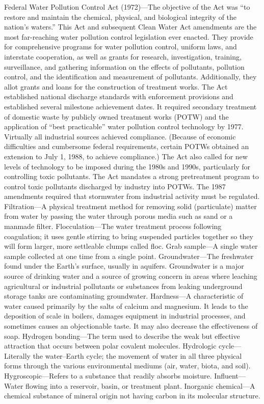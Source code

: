 \documentclass{article}
\begin{document}
Federal Water Pollution Control Act (1972)---The objective of the Act
was ``to restore and maintain the chemical, physical, and biological
integrity of the nation's waters.'' This Act and subsequent Clean Water
Act amendments are the most far-reaching water pollution control
legislation ever enacted. They provide for comprehensive programs for
water pollution control, uniform laws, and interstate cooperation, as
well as grants for research, investigation, training, surveillance, and
gathering information on the effects of pollutants, pollution control,
and the identification and measurement of pollutants. Additionally, they
allot grants and loans for the construction of treatment works. The Act
established national discharge standards with enforcement provisions and
established several milestone achievement dates. It required secondary
treatment of domestic waste by publicly owned treatment works (POTW) and
the application of ``best practicable'' water pollution control
technology by 1977. Virtually all industrial sources achieved
compliance. (Because of economic difficulties and cumbersome federal
requirements, certain POTWs obtained an extension to July 1, 1988, to
achieve compliance.) The Act also called for new levels of technology to
be imposed during the 1980s and 1990s, particularly for controlling
toxic pollutants. The Act mandates a strong pretreatment program to
control toxic pollutants discharged by industry into POTWs. The 1987
amendments required that stormwater from industrial activity must be
regulated. Filtration---A physical treatment method for removing solid
(particulate) matter from water by passing the water through porous
media such as sand or a manmade filter. Flocculation---The water
treatment process following coagulation; it uses gentle stirring to
bring suspended particles together so they will form larger, more
settleable clumps called floc. Grab sample---A single water sample
collected at one time from a single point. Groundwater---The freshwater
found under the Earth's surface, usually in aquifers. Groundwater is a
major source of drinking water and a source of growing concern in areas
where leaching agricultural or industrial pollutants or substances from
leaking underground storage tanks are contaminating groundwater.
Hardness---A characteristic of water caused primarily by the salts of
calcium and magnesium. It leads to the deposition of scale in boilers,
damages equipment in industrial processes, and sometimes causes an
objectionable taste. It may also decrease the effectiveness of soap.
Hydrogen bonding---The term used to describe the weak but effective
attraction that occurs between polar covalent molecules. Hydrologic
cycle---Literally the water--Earth cycle; the movement of water in all
three physical forms through the various environmental mediums (air,
water, biota, and soil). Hygroscopic---Refers to a substance that
readily absorbs moisture. Influent---Water flowing into a reservoir,
basin, or treatment plant. Inorganic chemical---A chemical substance of
mineral origin not having carbon in its molecular structure.
\end{document}
